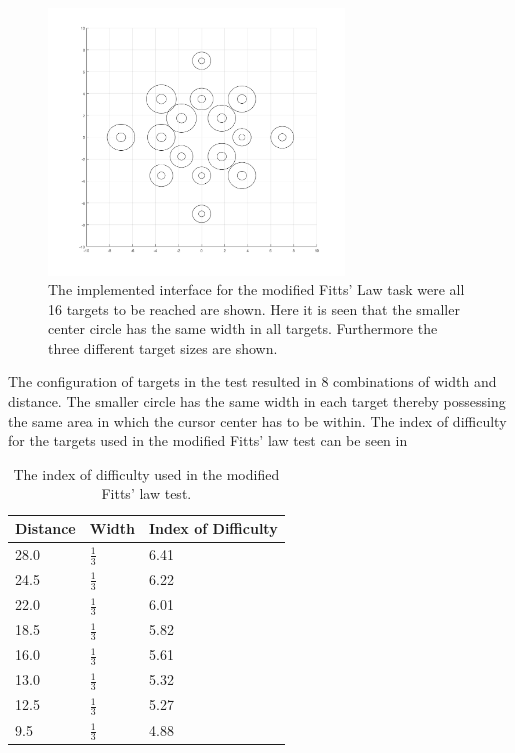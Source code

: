 \begin{figure}[H] 
	\includegraphics[width=0.7\textwidth]{figures/pMethods/DotsToReach}
	\caption{The implemented interface for the modified Fitts' Law task were all 16 targets to be reached are shown. Here it is seen that the smaller center circle has the same width in all targets. Furthermore the three different target sizes are shown.}
	\label{fig:alltargets}
\end{figure}


The configuration of targets in the test resulted in 8 combinations of width and distance. The smaller circle has the same width in each target thereby possessing the same area in which the cursor center has to be within. The index of difficulty for the targets used in the modified Fitts' law test can be seen in 

\begin{table}[H]
	\centering
	\caption{The index of difficulty used in the modified Fitts' law test.}
	\label{tab:M:ID}
	\begin{tabular}{l|l|l}
		
		Distance & Width         & Index of Difficulty \\ \hline
		28.0     & $\frac{1}{3}$ & 6.41                \\ \hline
		24.5     & $\frac{1}{3}$ & 6.22                \\ \hline
		22.0     & $\frac{1}{3}$ & 6.01                \\ \hline
		18.5     & $\frac{1}{3}$ & 5.82                \\ \hline
		16.0     & $\frac{1}{3}$ & 5.61                \\ \hline
		13.0     & $\frac{1}{3}$ & 5.32                \\ \hline
		12.5     & $\frac{1}{3}$ & 5.27                \\ \hline
		9.5      & $\frac{1}{3}$ & 4.88                \\ \hline
	\end{tabular}
\end{table}



